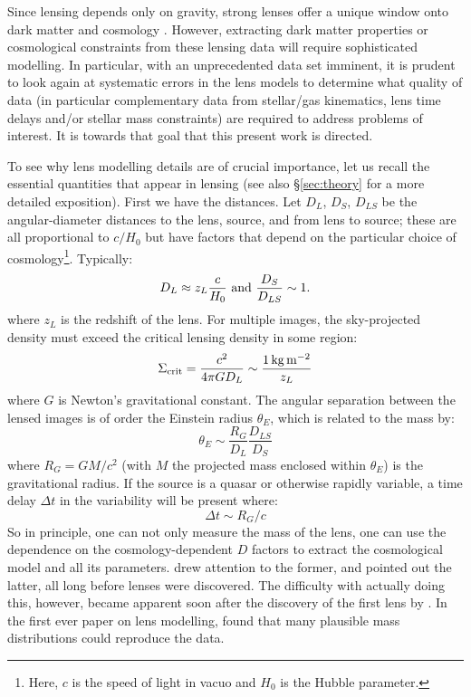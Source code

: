 \documentclass[galley,usenatbib]{mn2e}
\begin{document}
Since lensing depends only on gravity, strong lenses offer a unique window onto
dark matter and cosmology \citep{2010CQGra..27w3001B,2012arXiv1206.1225A}.
However, extracting dark matter properties or cosmological constraints from
these lensing data will require sophisticated modelling. In particular, with an
unprecedented data set imminent, it is prudent to look again at systematic
errors in the lens models to determine what quality of data (in particular
complementary data from stellar/gas kinematics, lens time delays and/or stellar
mass constraints) are required to address problems of interest. It is towards
that goal that this present work is directed.

To see why lens modelling details are of crucial importance, let us recall the
essential quantities that appear in lensing (see also \S\ref{sec:theory} for a
more detailed exposition). First we have the distances. Let $D_L$, $D_S$,
$D_{LS}$ be the angular-diameter distances to the lens, source, and from lens
to source; these are all proportional to $c/H_0$ but have factors that depend
on the particular choice of cosmology\footnote{Here, $c$ is the speed of light
in vacuo and $H_0$ is the Hubble parameter.}.  Typically:
%
\begin{equation}
D_L \approx z_L \frac c{H_0}\ \hbox{and}\ \frac{D_S}{D_{LS}} \sim 1.
\end{equation}
where $z_L$ is the redshift of the lens. 
%
For multiple images, the sky-projected density must exceed the critical lensing
density in some region:
%
\begin{equation}
\Sigma_\mathrm{crit} = \frac{c^2}{4\pi G D_L} \sim \frac{1\rm\,kg\,m^{-2}}{z_L}
\end{equation}
where $G$ is Newton's gravitational constant. 
%
The angular separation between the lensed images is of order
the Einstein radius $\theta_E$, which is related to
the mass by:
%
\begin{equation}
\theta_E \sim \frac{R_G}{D_L} \frac{D_{LS}}{D_S}
\end{equation}
%
where $R_G = GM/c^2$ (with $M$ the projected mass enclosed within $\theta_E$)
is the gravitational radius. If the source is a quasar or otherwise rapidly
variable, a time delay $\Delta t$ in the variability will be present where:
%
\begin{equation}
\Delta t \sim R_G/c
\end{equation}
%
So in principle, one can not only measure the mass of the lens, one can use the
dependence on the cosmology-dependent $D$ factors to extract the cosmological
model and all its parameters.  \cite{1937ApJ....86..217Z} drew attention to the
former, and \cite{1964MNRAS.128..307R,1966MNRAS.132..101R} pointed out the
latter, all long before lenses were discovered.  The difficulty with actually
doing this, however, became apparent soon after the discovery of the first lens
by \cite{1979Natur.279..381W}.  In the first ever paper on lens modelling,
\cite{1981ApJ...244..736Y} found that many plausible mass distributions could
reproduce the data.
\end{document}
